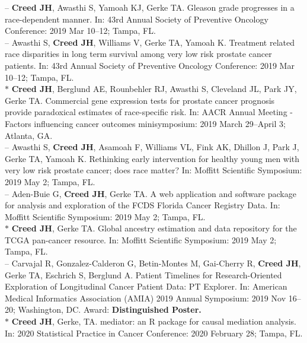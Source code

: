 \documentclass[11pt, a4paper]{article} %
\begin{document}
-- {\bf Creed JH}, Awasthi S, Yamoah KJ, Gerke TA. Gleason grade progresses in a race-dependent manner. In: 43rd Annual Society of Preventive Oncology Conference: 2019 Mar 10--12; Tampa, FL. \\

-- Awasthi S, {\bf Creed JH}, Williams V, Gerke TA, Yamoah K. Treatment related race disparities in long term survival among very low risk prostate cancer patients. In: 43rd Annual Society of Preventive Oncology Conference: 2019 Mar 10--12; Tampa, FL. \\

$*$ {\bf Creed JH}, Berglund AE, Rounbehler RJ, Awasthi S, Cleveland JL, Park JY, Gerke TA. Commercial gene expression tests for prostate cancer prognosis provide  paradoxical estimates of race-specific risk. In: AACR Annual Meeting - Factors influencing cancer outcomes minisymposium: 2019 March 29--April 3; Atlanta, GA. \\

-- Awasthi S, {\bf Creed JH}, Asamoah F, Williams VL, Fink AK, Dhillon J, Park J, Gerke TA, Yamoah K. Rethinking early intervention for healthy young men with very low risk prostate cancer; does race matter? In: Moffitt Scientific Symposium: 2019 May 2; Tampa, FL. \\

-- Aden-Buie G, {\bf Creed JH}, Gerke TA. A web application and software package for analysis and exploration of the FCDS Florida Cancer Registry Data. In: Moffitt Scientific Symposium: 2019 May 2; Tampa, FL. \\

$*$ {\bf Creed JH}, Gerke TA. Global ancestry estimation and data repository for the TCGA pan-cancer resource.  In: Moffitt Scientific Symposium: 2019 May 2; Tampa, FL. \\

-- Carvajal R, Gonzalez-Calderon G, Betin-Montes M, Gai-Cherry R, {\bf Creed JH}, Gerke TA, Eschrich S, Berglund A. Patient Timelines for Research-Oriented Exploration of Longitudinal Cancer Patient Data: PT Explorer. In: American Medical Informatics Association (AMIA) 2019 Annual Symposium: 2019 Nov 16--20; Washington, DC. Award: {\bf Distinguished Poster.}\\

$*$ {\bf Creed JH}, Gerke, TA. mediator: an R package for causal mediation analysis.  In: 2020 Statistical Practice in Cancer Conference: 2020 February 28; Tampa, FL. \\ 
\end{document}
